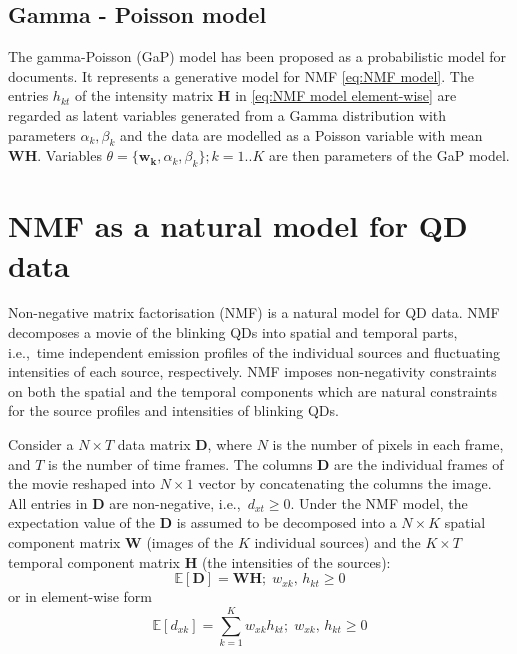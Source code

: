 
\subsection{Gamma - Poisson model \label{sub:GaP}}
The gamma-Poisson (GaP) model has been proposed \cite{Canny2004} as a probabilistic model for documents. It represents a generative model for NMF \autoref{eq:NMF model}. The entries $h_{kt}$ of the intensity matrix $\bm{H}$ in \autoref{eq:NMF model element-wise} are regarded as latent variables generated from a Gamma distribution with parameters $\alpha_{k}, \beta_{k}$ and the data are modelled as a Poisson variable with mean $\bm{WH}$. Variables $\theta = \{\bm{w_{k}},\alpha_{k}, \beta_{k}\}; k = 1..K$ are then parameters of the GaP model.

\clearpage
\section{NMF as a natural model for QD data\label{sec: NMF}}
Non-negative matrix factorisation (NMF) \cite{Lee1999,Lee2001} is a natural model for QD data. NMF decomposes a movie of the blinking QDs into spatial and temporal parts, i.e.,\ time independent emission profiles of the individual sources and fluctuating intensities of each source, respectively. NMF imposes non-negativity constraints on both the spatial and the temporal components which are natural constraints for the source profiles and intensities of blinking QDs.

Consider a $N\times T$ data matrix $\bm{D}$, where $N$ is the number of pixels in each frame, and $T$ is the number of time frames. The columns $\bm{D}$ are the individual frames of the movie reshaped into $N\times 1$ vector by concatenating the columns the image. All entries in $\bm{D}$ are non-negative, i.e.,\ $d_{xt}\geq 0$. Under the NMF model, the expectation value of the $\bm{D}$ is assumed to be decomposed into a $N\times K$ spatial component matrix $\bm{W}$ (images of the $K$ individual sources) and the $K\times T$ temporal component matrix $\bm{H}$ (the intensities of the sources):
%
\begin{equation}
	\mathbb{E}\left[\bm{D}\right]=\bm{WH};\;w_{xk},\, h_{kt}\geq0
	\label{eq:NMF model}
\end{equation}
%
or in element-wise form
%
\begin{equation}
	\mathbb{E}\left[d_{xk}\right]=\sum_{k=1}^{K}w_{xk}h_{kt};\;w_{xk},\, h_{kt}\geq0
	\label{eq:NMF model element-wise}
\end{equation}


